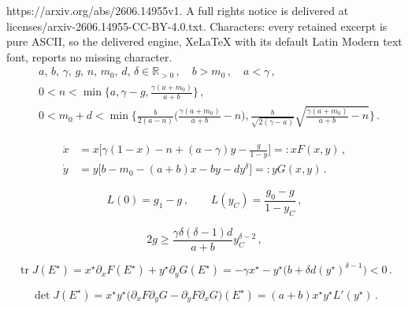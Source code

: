 \documentclass[10pt,a4paper]{amsart}
\newcommand{\R}{\mathbb{R}}
\begin{document}
https://arxiv.org/abs/2606.14955v1. A full rights notice is delivered at licenses/arxiv-2606.14955-CC-BY-4.0.txt. Characters: every retained excerpt is pure ASCII, so the delivered engine, XeLaTeX with its default Latin Modern text font, reports no missing character.
\begin{equation}\label{GA}\tag{GA}
\begin{aligned}
& a,\,b,\,\gamma,\,g,\,n,\,m_0,\,d,\,\delta\in\R_{>0}\,,\quad b>m_0\,,\quad a<\gamma\,, \\[1ex]
& 0<n<\min\Big\{a, \gamma-g, \tfrac{\gamma(a+m_0)}{a+b}\Big\}\,, \\[1ex]
& 0<m_0+d<\min\Big\{\tfrac{b}{2(a-n)}\Big(\tfrac{\gamma(a+m_0)}{a+b}-n\Big), \tfrac{b}{\sqrt{2(\gamma-a)}}\sqrt{\tfrac{\gamma(a+m_0)}{a+b}-n}\Big\}\,.
\end{aligned}
\end{equation}

\begin{subequations}\label{dxdy}
\begin{align}
\dot x &= x\Big[\gamma(1-x) - n + (a-\gamma)y - \frac{g}{1-y}\Big] =: xF(x,y)\,, \label{dxdy1}\\
\dot y &= y\Big[b - m_0 - (a+b)x - by - dy^{\delta}\Big] =: yG(x,y)\,. \label{dxdy2}
\end{align}
\end{subequations}

\begin{equation}\label{Lends}
L(0)=g_1-g\,,\qquad L(y_C)=\frac{g_0-g}{1-y_C}\,,
\end{equation}

\begin{equation}\label{concbound}
2g\ge\frac{\gamma\delta(\delta-1)d}{a+b}y_C^{\delta-2}\,,
\end{equation}

\begin{equation}\label{trJ}
\operatorname{tr}J(E^\star)=x^\star\partial_xF(E^\star)+y^\star\partial_yG(E^\star)=-\gamma x^\star-y^\star\big(b+\delta d(y^\star)^{\delta-1}\big)<0\,.
\end{equation}

\begin{equation}\label{detJ}
\det J(E^\star)=x^\star y^\star\big(\partial_xF\partial_yG-\partial_yF\partial_xG\big)(E^\star)=(a+b)x^\star y^\star L'(y^\star)\,.
\end{equation}
\end{document}
